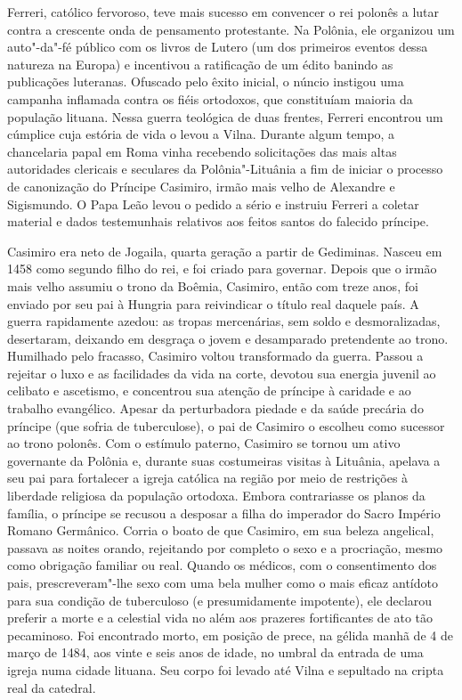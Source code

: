 Ferreri, católico fervoroso, teve mais sucesso em convencer o rei
polonês a lutar contra a crescente onda de pensamento protestante. Na
Polônia, ele organizou um auto"-da"-fé público com os livros de Lutero (um
dos primeiros eventos dessa natureza na Europa) e incentivou a
ratificação de um édito banindo as publicações luteranas. Ofuscado pelo
êxito inicial, o núncio instigou uma campanha inflamada contra os fiéis
ortodoxos, que constituíam maioria da população lituana. Nessa guerra
teológica de duas frentes, Ferreri encontrou um cúmplice cuja estória de
vida o levou a Vilna. Durante algum tempo, a chancelaria papal em Roma
vinha recebendo solicitações das mais altas autoridades clericais e
seculares da Polônia"-Lituânia a fim de iniciar o processo de canonização
do Príncipe Casimiro, irmão mais velho de Alexandre e Sigismundo. O Papa
Leão  levou o pedido a sério e instruiu Ferreri a coletar material e
dados testemunhais relativos aos feitos santos do falecido príncipe.

Casimiro era neto de Jogaila, quarta geração a partir de Gediminas.
Nasceu em 1458 como segundo filho do rei, e foi criado para governar.
Depois que o irmão mais velho assumiu o trono da Boêmia, Casimiro, então
com treze anos, foi enviado por seu pai à Hungria para reivindicar o
título real daquele país. A guerra rapidamente azedou: as tropas
mercenárias, sem soldo e desmoralizadas, desertaram, deixando em
desgraça o jovem e desamparado pretendente ao trono. Humilhado pelo
fracasso, Casimiro voltou transformado da guerra. Passou a rejeitar o
luxo e as facilidades da vida na corte, devotou sua energia juvenil ao
celibato e ascetismo, e concentrou sua atenção de príncipe à caridade e
ao trabalho evangélico. Apesar da perturbadora piedade e da saúde
precária do príncipe (que sofria de tuberculose), o pai de Casimiro o
escolheu como sucessor ao trono polonês. Com o estímulo paterno,
Casimiro se tornou um ativo governante da Polônia e, durante suas
costumeiras visitas à Lituânia, apelava a seu pai para fortalecer a
igreja católica na região por meio de restrições à liberdade religiosa
da população ortodoxa. Embora contrariasse os planos da família, o
príncipe se recusou a desposar a filha do imperador do Sacro Império
Romano Germânico. Corria o boato de que Casimiro, em sua beleza
angelical, passava as noites orando, rejeitando por completo o sexo e a
procriação, mesmo como obrigação familiar ou real. Quando os médicos,
com o consentimento dos pais, prescreveram"-lhe sexo com uma bela mulher
como o mais eficaz antídoto para sua condição de tuberculoso (e
presumidamente impotente), ele declarou preferir a morte e a celestial
vida no além aos prazeres fortificantes de ato tão pecaminoso. Foi
encontrado morto, em posição de prece, na gélida manhã de 4 de março de
1484, aos vinte e seis anos de idade, no umbral da entrada de uma igreja
numa cidade lituana. Seu corpo foi levado até Vilna e sepultado na
cripta real da catedral.

